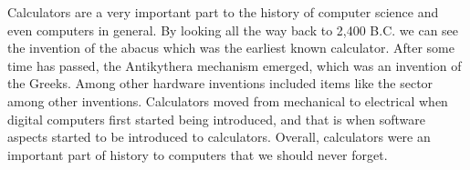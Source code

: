\documentclass[../computer-history.tex]{subfiles}
\begin{document}
Calculators are a very important part to the history of computer science and even computers in general. By looking all the way back to 2,400 B.C. we can see the invention of the abacus which was the earliest known calculator. After some time has passed, the Antikythera mechanism emerged, which was an invention of the Greeks. Among other hardware inventions included items like the sector among other inventions. Calculators moved from mechanical to electrical when digital computers first started being introduced, and that is when software aspects started to be introduced to calculators. Overall, calculators were an important part of history to computers that we should never forget.
\biblio
\end{document}
